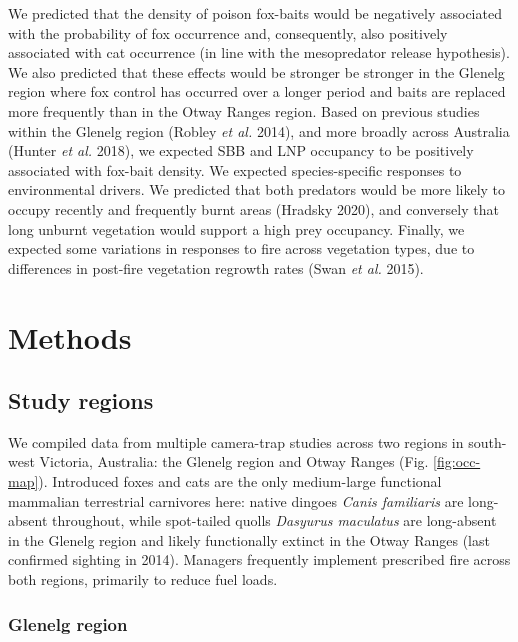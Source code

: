\documentclass[11pt,a4paper,titlepage,twoside,openright]{style/unimelbthesis}
\begin{document}
\begin{mainmatter}
We predicted that the density of poison fox-baits would be negatively associated with the probability of fox occurrence and, consequently, also positively associated with cat occurrence (in line with the mesopredator release hypothesis). We also predicted that these effects would be stronger be stronger in the Glenelg region where fox control has occurred over a longer period and baits are replaced more frequently than in the Otway Ranges region. Based on previous studies within the Glenelg region (Robley \emph{et al.} 2014), and more broadly across Australia (Hunter \emph{et al.} 2018), we expected SBB and LNP occupancy to be positively associated with fox-bait density. We expected species-specific responses to environmental drivers. We predicted that both predators would be more likely to occupy recently and frequently burnt areas (Hradsky 2020), and conversely that long unburnt vegetation would support a high prey occupancy. Finally, we expected some variations in responses to fire across vegetation types, due to differences in post-fire vegetation regrowth rates (Swan \emph{et al.} 2015).

\newpage

\hypertarget{methods-1}{%
\section{Methods}\label{methods-1}}

\hypertarget{study-regions}{%
\subsection{Study regions}\label{study-regions}}

We compiled data from multiple camera-trap studies across two regions in south-west Victoria, Australia: the Glenelg region and Otway Ranges (Fig. \ref{fig:occ-map}). Introduced foxes and cats are the only medium-large functional mammalian terrestrial carnivores here: native dingoes \emph{Canis familiaris} are long-absent throughout, while spot-tailed quolls \emph{Dasyurus maculatus} are long-absent in the Glenelg region and likely functionally extinct in the Otway Ranges (last confirmed sighting in 2014). Managers frequently implement prescribed fire across both regions, primarily to reduce fuel loads.

\hypertarget{glenelg-region}{%
\subsubsection{Glenelg region}\label{glenelg-region}}


\end{mainmatter}
\end{document}
